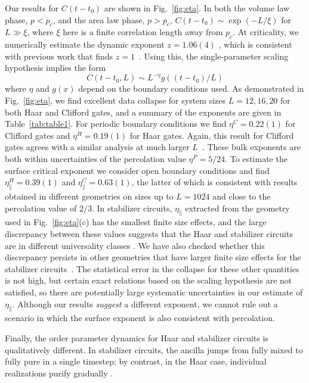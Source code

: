 \documentclass[prl,twocolumn,aps,showpacs,amsmath,amssymb,superscriptaddress,floatfix,longbibliography]{revtex4-1}
\begin{document}
Our results for $C(t-t_0)$ are shown in Fig.~\ref{fig:eta}. In both the volume law phase, $p < p_c$, and the area law phase, $p>p_c$, $C(t-t_0) \sim \exp(-L/\xi)$ for $L\gg\xi$, where $\xi$ here is a finite correlation length away from $p_c$.  At criticality, we numerically estimate the dynamic exponent $z = 1.06(4)$ \cite{suppmat}, which is consistent  with previous work 
that finds $z=1$~\cite{Vasseur2018,Skinner2019,LCF2018,LCF2019}. Using this, the single-parameter scaling hypothesis implies the form\begin{equation}
C(t-t_0,L) \sim L^{-\eta} g((t-t_0)/L)
\label{eqn:cfc}
\end{equation}
where $\eta$ and $g(x)$ depend on the boundary conditions used.  As demonstrated in Fig.~\ref{fig:eta}, we find excellent data collapse for system sizes $L=12,16,20$ for both Haar and Clifford gates, and a summary of the exponents are given in Table~\ref{tab:table1}. For periodic boundary conditions 
we 
find $\eta^C= 0.22(1)$ for Clifford gates and $\eta^H = 0.19(1)$ for Haar gates. Again, this result for Clifford gates agrees with a similar analysis at much larger $L$~\cite{Gullans2019b}.  These bulk exponents are both within uncertainties of the percolation value $\eta^P=5/24$.  To estimate the surface critical exponent we consider open boundary conditions 
and find $\eta_\parallel^H = 0.39(1)$ and $\eta_\parallel^C = 0.63(1)$, the latter of which is consistent with results obtained in different geometries on sizes up to $L = 1024$ \cite{Gullans2019b} and close to the percolation value of $2/3$. In stabilizer circuits, $\eta_\parallel$ extracted from the geometry used in Fig.~\ref{fig:eta}(c) has the smallest finite size effects, and the large discrepancy between these values suggests that the Haar and stabilizer circuits are in different universality classes \cite{Cardy84}. 
We have also checked whether this discrepancy persists in other geometries that have larger finite size effects for the stabilizer circuits~\cite{suppmat}. The statistical error in the collapse for these other quantities is not high, but certain exact relations based on the scaling hypothesis are not satisfied,  so there are potentially large systematic uncertainties in our estimate of $\eta_{\parallel}$. Although our results \emph{suggest} a different exponent, we cannot rule out a scenario in which the surface exponent is also consistent with percolation.


Finally, the order parameter dynamics for Haar and stabilizer circuits is qualitatively different. In stabilizer circuits, the ancilla jumps from fully mixed to fully pure in a single timestep; by contrast, in the Haar case, individual realizations purify gradually \cite{suppmat}.
\end{document}
